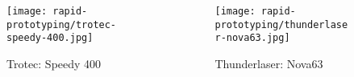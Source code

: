 \begin{frame}
\begin{columns}
\begin{column}{0.5\textwidth}
\begin{figure}
                \texttt{[image: rapid-prototyping/trotec-speedy-400.jpg]}
                \caption{Trotec: Speedy 400}
            \end{figure}
        \end{column}
        \begin{column}{0.5\textwidth}
            \begin{figure}
                \texttt{[image: rapid-prototyping/thunderlaser-nova63.jpg]}
                \caption{Thunderlaser: Nova63}
            \end{figure}
        \end{column}
    \end{columns}
\end{frame}

